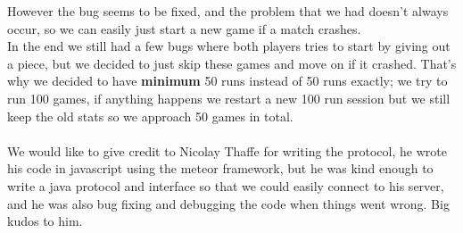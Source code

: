 \documentclass[12pt, a4paper]{article}
\begin{document}
However the bug seems to be fixed, and the problem that we had doesn't always occur, so we can easily just start a new game if a match crashes. \\
In the end we still had a few bugs where both players tries to start by giving out a piece, but we decided to just skip these games and move on if it crashed. That's why we decided to have \textbf{minimum} 50 runs instead of 50 runs exactly; we try to run 100 games, if anything happens we restart a new 100 run session but we still keep the old stats so we approach 50 games in total.\\ \\
We would like to give credit to Nicolay Thaffe for writing the protocol, he wrote his code in javascript using the meteor framework, but he was kind enough to write a java protocol and interface so that we could easily connect to his server, and he was also bug fixing and debugging the code when things went wrong. Big kudos to him. \\
\end{document}
